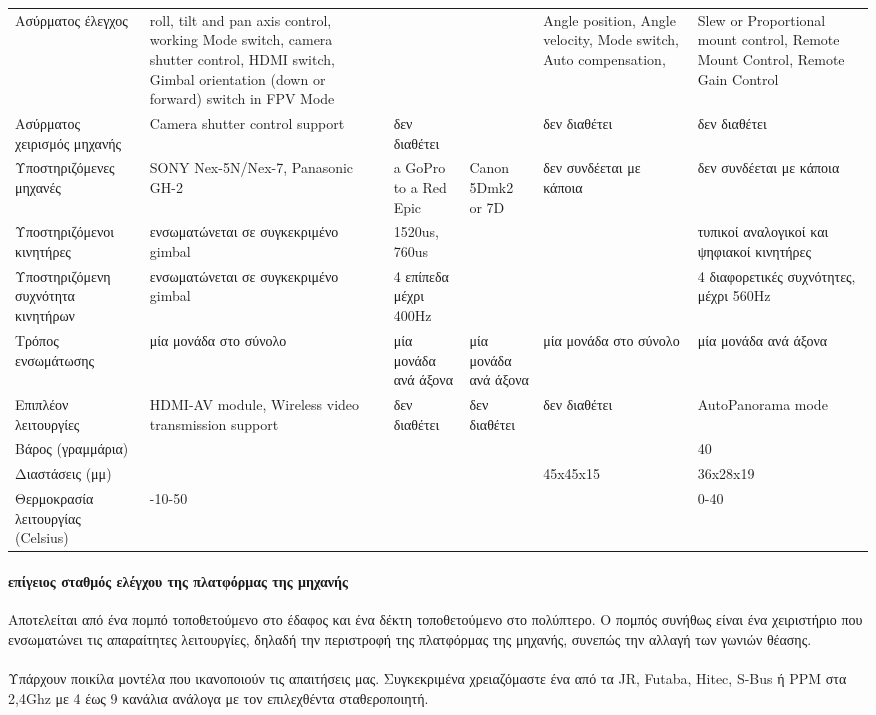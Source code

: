 \documentclass[a4paper, 12pt, twoside]{report}
\begin{document}
{{{{{{\begin{landscape}
\begin{longtable} { m{3cm} m{3cm} m{3cm} m{3cm} m{3cm} m{3cm} }
					\hdashline
					Ασύρματος έλεγχος & roll, tilt and pan axis control, working Mode switch, camera shutter control, HDMI switch, Gimbal orientation (down or forward) switch in FPV Mode & & & Angle position, Angle velocity, Mode switch, Auto compensation, & Slew or Proportional mount control, Remote Mount Control, Remote Gain Control\\
					\hdashline
					Ασύρματος χειρισμός μηχανής & Camera shutter control support & δεν διαθέτει & & δεν διαθέτει & δεν διαθέτει\\
					\hdashline
					Υποστηριζόμενες μηχανές & SONY Nex-5N/Nex-7, Panasonic GH-2 & a GoPro to a Red Epic & Canon 5Dmk2 or 7D & δεν συνδέεται με κάποια & δεν συνδέεται με κάποια\\
					\hdashline
					Υποστηριζόμενοι κινητήρες & ενσωματώνεται σε συγκεκριμένο gimbal & 1520us, 760us & & & τυπικοί αναλογικοί και ψηφιακοί κινητήρες\\
					Υποστηριζόμενη συχνότητα κινητήρων  & ενσωματώνεται σε συγκεκριμένο gimbal & 4 επίπεδα μέχρι 400Hz & & & 4 διαφορετικές συχνότητες, μέχρι 560Hz\\
					\hdashline
					Τρόπος ενσωμάτωσης & μία μονάδα στο σύνολο & μία μονάδα ανά άξονα & μία μονάδα ανά άξονα & μία μονάδα στο σύνολο & μία μονάδα ανά άξονα\\
					\hdashline
					Επιπλέον λειτουργίες & HDMI-AV module, Wireless video transmission support & δεν διαθέτει & δεν διαθέτει & δεν διαθέτει & AutoPanorama mode \\
					\hdashline
					Βάρος (γραμμάρια) & & & & & 40\\
					\hdashline
					Διαστάσεις (μμ) & & & & 45x45x15 & 36x28x19\\
					\hdashline
					Θερμοκρασία λειτουργίας (Celsius) & -10-50 & & & & 0-40\\
					\hline
				\end{longtable}
				\end{landscape}
			
			\paragraph{επίγειος σταθμός ελέγχου της πλατφόρμας της μηχανής}{Αποτελείται από ένα πομπό τοποθετούμενο στο έδαφος και ένα δέκτη τοποθετούμενο στο πολύπτερο. Ο πομπός συνήθως είναι ένα χειριστήριο που ενσωματώνει τις απαραίτητες λειτουργίες, δηλαδή την περιστροφή της πλατφόρμας της μηχανής, συνεπώς την αλλαγή των γωνιών θέασης.
			}
			\paragraph{}{Υπάρχουν ποικίλα μοντέλα που ικανοποιούν τις απαιτήσεις μας. Συγκεκριμένα χρειαζόμαστε ένα από τα JR, Futaba, Hitec, S-Bus ή PPM στα 2,4Ghz με 4 έως 9 κανάλια ανάλογα με τον επιλεχθέντα σταθεροποιητή.
			}
					
}}}}}}
\end{document}
